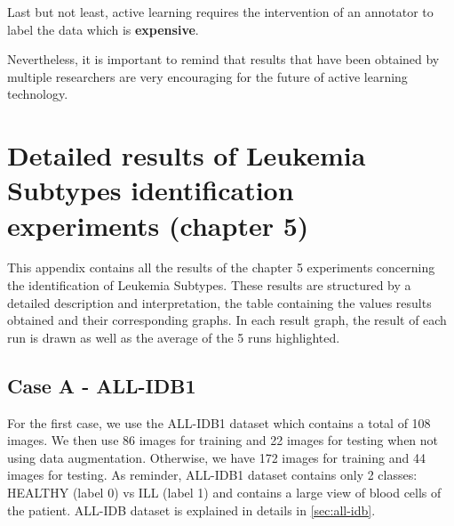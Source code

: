 \documentclass[11pt, openany]{report}
\theoremstyle{plain}
\theoremstyle{definition}
\theoremstyle{remark}
\begin{document}
Last but not least, active learning requires the intervention of an annotator to label the data which is \textbf{expensive}.

Nevertheless, it is important to remind that results that have been obtained by multiple researchers are very encouraging for the future of active learning technology. 





\nocite{*}





\newpage
\appendix

\chapter{Detailed results of Leukemia Subtypes identification experiments (chapter 5)}

This appendix contains all the results of the chapter 5 experiments concerning the identification of Leukemia Subtypes. These results are structured by a detailed description and interpretation, the table containing the values results obtained and their corresponding graphs. In each result graph, the result of each run is drawn as well as the average of the 5 runs highlighted. 



\section{Case A - ALL-IDB1} \label{sec:appendix-case-A}

For the first case, we use the ALL-IDB1 dataset which contains a total of 108 images. We then use 86 images for training and 22 images for testing when not using data augmentation. Otherwise, we have 172 images for training and 44 images for testing. As reminder, ALL-IDB1 dataset contains only 2 classes: HEALTHY (label 0) vs ILL (label 1) and contains a large view of blood cells of the patient. ALL-IDB dataset is explained in details in \autoref{sec:all-idb}.    
\end{document}
